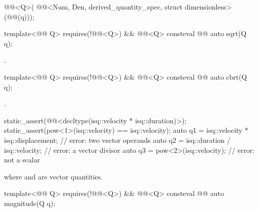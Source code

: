 \begin{itemdescr}
\pnum
\returns
\begin{codeblock}
@@<Q{}>(
  @@<Num, Den, derived_quantity_spec, struct dimensionless>(@@(q)));
\end{codeblock}
\end{itemdescr}

\begin{itemdecl}
template<@@ Q>
  requires(!@@<Q>) && @@<Q>
consteval @@ auto sqrt(Q q);
\end{itemdecl}

\begin{itemdescr}
\pnum
\returns
{}.
\end{itemdescr}

\begin{itemdecl}
template<@@ Q>
  requires(!@@<Q>) && @@<Q>
consteval @@ auto cbrt(Q q);
\end{itemdecl}

\begin{itemdescr}
\pnum
\returns
{}.
\end{itemdescr}

\begin{example}
\begin{codeblock}
static_assert(@@<decltype(isq::velocity * isq::duration)>);
static_assert(pow<1>(isq::velocity) == isq::velocity);
auto q1 = isq::velocity * isq::displacement;  // error: two vector operands
auto q2 = isq::duration / isq::velocity;      // error: a vector divisor
auto q3 = pow<2>(isq::velocity);              // error: not a scalar
\end{codeblock}
where  and  are vector quantities.
\end{example}

\begin{itemdecl}
template<@@ Q>
  requires(!@@<Q>) && @@<Q>
consteval @@ auto magnitude(Q q);
\end{itemdecl}

